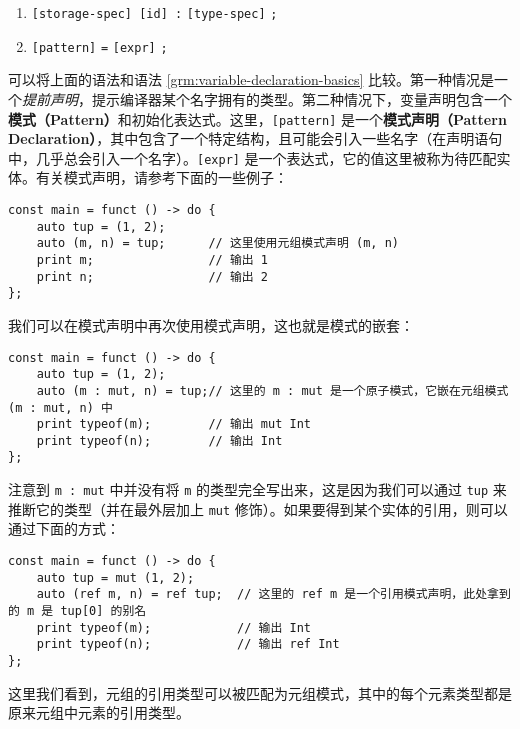 \begin{grammar}[声明语句] \label{grm:declaration-statement}
\begin{enumerate}
    \item \lstinline![storage-spec] [id] :! \texttt{[type-spec]} \lstinline!;!
    \item \texttt{[pattern]} \lstinline!=! \texttt{[expr]} \lstinline!;!
\end{enumerate}
\end{grammar}

可以将上面的语法和语法 \ref{grm:variable-declaration-basics} 比较。第一种情况是一个\emph{提前声明}，提示编译器某个名字拥有的类型。第二种情况下，变量声明包含一个\textbf{模式（Pattern）}和初始化表达式。这里，\lstinline![pattern]! 是一个\textbf{模式声明（Pattern Declaration）}，其中包含了一个特定结构，且可能会引入一些名字（在声明语句中，几乎总会引入一个名字）。\lstinline![expr]! 是一个表达式，它的值这里被称为待匹配实体。有关模式声明，请参考下面的一些例子：

\begin{lstlisting}
const main = funct () -> do {
    auto tup = (1, 2);
    auto (m, n) = tup;      // 这里使用元组模式声明 (m, n)
    print m;                // 输出 1
    print n;                // 输出 2
};
\end{lstlisting}

我们可以在模式声明中再次使用模式声明，这也就是模式的嵌套：

\begin{lstlisting}
const main = funct () -> do {
    auto tup = (1, 2);
    auto (m : mut, n) = tup;// 这里的 m : mut 是一个原子模式，它嵌在元组模式 (m : mut, n) 中
    print typeof(m);        // 输出 mut Int
    print typeof(n);        // 输出 Int
};
\end{lstlisting}

注意到 \lstinline!m : mut! 中并没有将 \lstinline!m! 的类型完全写出来，这是因为我们可以通过 \lstinline!tup! 来推断它的类型（并在最外层加上 \lstinline!mut! 修饰）。如果要得到某个实体的引用，则可以通过下面的方式：

\begin{lstlisting}
const main = funct () -> do {
    auto tup = mut (1, 2);
    auto (ref m, n) = ref tup;  // 这里的 ref m 是一个引用模式声明，此处拿到的 m 是 tup[0] 的别名
    print typeof(m);            // 输出 Int
    print typeof(n);            // 输出 ref Int
};
\end{lstlisting}

这里我们看到，元组的引用类型可以被匹配为元组模式，其中的每个元素类型都是原来元组中元素的引用类型。 \\

